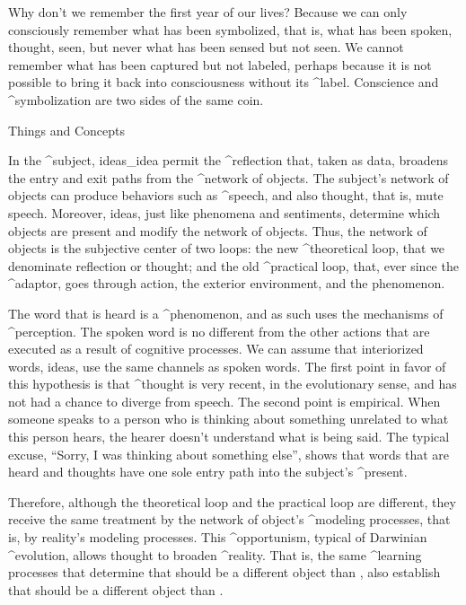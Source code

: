 Why don't we remember the first year of our lives?  Because we can only
consciously remember what has been symbolized, that is, what has been
spoken, thought, seen, but never what has been sensed but not seen. We
cannot remember what has been captured but not labeled, perhaps because
it is not possible to bring it back into consciousness without its
^{label}. Conscience and ^{symbolization} are two sides of the same
coin.


\Section Things and Concepts

In the ^{subject}, ideas_{idea} permit the ^{reflection} that, taken as
data, broadens the entry and exit paths from the ^{network of objects}.
The subject's network of objects can produce behaviors such as
^{speech}, and also thought, that is, mute speech. Moreover, ideas, just
like phenomena and sentiments, determine which objects are present and
modify the network of objects. Thus, the network of objects is the
subjective center of two loops: the new ^{theoretical loop}, that we
denominate reflection or thought; and the old ^{practical loop}, that,
ever since the ^{adaptor}, goes through action, the exterior
environment, and the phenomenon.

The word that is heard is a ^{phenomenon}, and as such uses the
mechanisms of ^{perception}. The spoken word is no different from the
other actions that are executed as a result of cognitive processes. We
can assume that interiorized words, ideas, use the same channels as
spoken words. The first point in favor of this hypothesis is that
^{thought} is very recent, in the evolutionary sense, and has not had a
chance to diverge from speech. The second point is empirical. When
someone speaks to a person who is thinking about something unrelated to
what this person hears, the hearer doesn't understand what is being
said. The typical excuse, ``Sorry, I was thinking about something
else'', shows that words that are heard and thoughts have one sole entry
path into the subject's ^{present}.

Therefore, although the theoretical loop and the practical loop are
different, they receive the same treatment by the network of object's
^{modeling} processes, that is, by reality's modeling processes. This
^{opportunism}, typical of Darwinian ^{evolution}, allows thought to
broaden ^{reality}. That is, the same ^{learning} processes that
determine that  should be a different object than
, also establish that  should be a
different object than .

